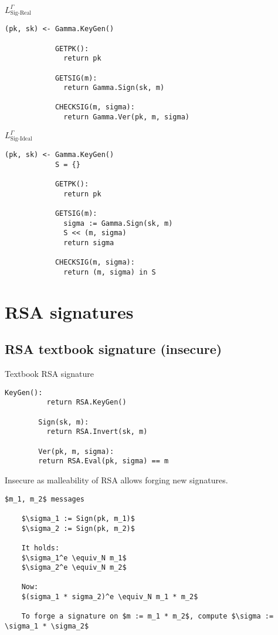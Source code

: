\documentclass[a4paper]{scrreprt}
\begin{document}
\begin{tcbraster}[raster columns=2,raster equal height,nobeforeafter,raster column skip=2cm]
	\begin{library}{$L^\Gamma_{\text{Sig-Real}}$}
		\begin{lstlisting}[mathescape=true,autogobble=true]
			(pk, sk) <- Gamma.KeyGen()

			GETPK():
			  return pk

			GETSIG(m):
			  return Gamma.Sign(sk, m)

			CHECKSIG(m, sigma):
			  return Gamma.Ver(pk, m, sigma)
		\end{lstlisting}
	\end{library}
	\begin{library}{$L^\Gamma_{\text{Sig-Ideal}}$}
		\begin{lstlisting}[mathescape=true,autogobble=true]
			(pk, sk) <- Gamma.KeyGen()
			S = {}

			GETPK():
			  return pk

			GETSIG(m):
			  sigma := Gamma.Sign(sk, m)
			  S << (m, sigma)
			  return sigma

			CHECKSIG(m, sigma):
			  return (m, sigma) in S
		\end{lstlisting}
	\end{library}
\end{tcbraster}

\section{RSA signatures}

\subsection{RSA textbook signature (insecure)}

\begin{library}{Textbook RSA signature}
	\begin{lstlisting}[mathescape=true,autogobble=true]
		KeyGen():
		  return RSA.KeyGen()

		Sign(sk, m):
		  return RSA.Invert(sk, m)

		Ver(pk, m, sigma):
		return RSA.Eval(pk, sigma) == m
	\end{lstlisting}
\end{library}

Insecure as malleability of RSA allows forging new signatures.

\begin{lstlisting}[mathescape=true,autogobble=true]
	$m_1, m_2$ messages

	$\sigma_1 := Sign(pk, m_1)$
	$\sigma_2 := Sign(pk, m_2)$

	It holds:
	$\sigma_1^e \equiv_N m_1$
	$\sigma_2^e \equiv_N m_2$

	Now:
	$(sigma_1 * sigma_2)^e \equiv_N m_1 * m_2$

	To forge a signature on $m := m_1 * m_2$, compute $\sigma := \sigma_1 * \sigma_2$
\end{lstlisting}
\end{document}
